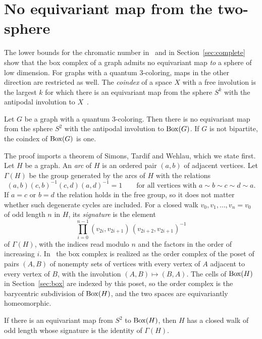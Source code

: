\section{No equivariant map from the two-sphere}\label{sec:coindex}

The lower bounds for the chromatic number in~\cite{Z} and in Section~\ref{sec:complete} show that the box complex of a graph admits no equivariant map \emph{to} a sphere of low dimension. For graphs with a quantum $3$-coloring, maps in the other direction are restricted as well. The \emph{coindex} of a space $X$ with a free involution is the largest $k$ for which there is an equivariant map from the sphere $S^k$ with the antipodal involution to $X$~\cite{Mat}.

\begin{proposition}\label{prop:coindex}
Let $G$ be a graph with a quantum $3$-coloring. Then there is no equivariant map from the sphere $S^2$ with the antipodal involution to $\operatorname{Box}(G)$. If $G$ is not bipartite, the coindex of $\operatorname{Box}(G)$ is one.
\end{proposition}

The proof imports a theorem of Simons, Tardif and Wehlau, which we state first. Let $H$ be a graph. An \emph{arc} of $H$ is an ordered pair $(a,b)$ of adjacent vertices. Let $\Gamma(H)$ be the group generated by the arcs of $H$ with the relations
\begin{equation}\label{eq:stw-relation}
 (a,b)(c,b)^{-1}(c,d)(a,d)^{-1}=1\qquad\text{for all vertices with }a\sim b\sim c\sim d\sim a .
\end{equation}
If $a=c$ or $b=d$ the relation holds in the free group, so it does not matter whether such degenerate cycles are included. For a closed walk $v_0,v_1,\ldots,v_n=v_0$ of odd length $n$ in $H$, its \emph{signature} is the element
\[
 \prod_{i=0}^{n-1}(v_{2i},v_{2i+1})\,(v_{2i+2},v_{2i+1})^{-1}
\]
of $\Gamma(H)$, with the indices read modulo $n$ and the factors in the order of increasing $i$. In~\cite{STW} the box complex is realized as the order complex of the poset of pairs $(A,B)$ of nonempty sets of vertices with every vertex of $A$ adjacent to every vertex of $B$, with the involution $(A,B)\mapsto(B,A)$. The cells of $\operatorname{Box}(H)$ in Section~\ref{sec:box} are indexed by this poset, so the order complex is the barycentric subdivision of $\operatorname{Box}(H)$, and the two spaces are equivariantly homeomorphic.

\begin{theorem}\label{thm:stw}
If there is an equivariant map from $S^2$ to $\operatorname{Box}(H)$, then $H$ has a closed walk of odd length whose signature is the identity of $\Gamma(H)$.
\end{theorem}

